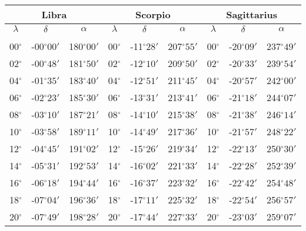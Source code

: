 \begin{table}
\centering
\begin{tabular}{ccc|ccc|ccc}
\multicolumn{3}{c}{Libra}\vline & \multicolumn{3}{c}{Scorpio} \vline& \multicolumn{3}{c}{Sagittarius}\\\hline
$\lambda$& $\delta$& $\alpha$& $\lambda$& $\delta$& $\alpha$& $\lambda$& $\delta$& $\alpha$\\\hline
&&&&&&&&\\[-2ex]
00$^\circ$ & -00$^\circ$$00'$ & 180$^\circ$$00'$ & 00$^\circ$ & -11$^\circ$$28'$ & 207$^\circ$$55'$ & 00$^\circ$ & -20$^\circ$$09'$ & 237$^\circ$$49'$\\
02$^\circ$ & -00$^\circ$$48'$ & 181$^\circ$$50'$ & 02$^\circ$ & -12$^\circ$$10'$ & 209$^\circ$$50'$ & 02$^\circ$ & -20$^\circ$$33'$ & 239$^\circ$$54'$\\
04$^\circ$ & -01$^\circ$$35'$ & 183$^\circ$$40'$ & 04$^\circ$ & -12$^\circ$$51'$ & 211$^\circ$$45'$ & 04$^\circ$ & -20$^\circ$$57'$ & 242$^\circ$$00'$\\
06$^\circ$ & -02$^\circ$$23'$ & 185$^\circ$$30'$ & 06$^\circ$ & -13$^\circ$$31'$ & 213$^\circ$$41'$ & 06$^\circ$ & -21$^\circ$$18'$ & 244$^\circ$$07'$\\
08$^\circ$ & -03$^\circ$$10'$ & 187$^\circ$$21'$ & 08$^\circ$ & -14$^\circ$$10'$ & 215$^\circ$$38'$ & 08$^\circ$ & -21$^\circ$$38'$ & 246$^\circ$$14'$\\
10$^\circ$ & -03$^\circ$$58'$ & 189$^\circ$$11'$ & 10$^\circ$ & -14$^\circ$$49'$ & 217$^\circ$$36'$ & 10$^\circ$ & -21$^\circ$$57'$ & 248$^\circ$$22'$\\
12$^\circ$ & -04$^\circ$$45'$ & 191$^\circ$$02'$ & 12$^\circ$ & -15$^\circ$$26'$ & 219$^\circ$$34'$ & 12$^\circ$ & -22$^\circ$$13'$ & 250$^\circ$$30'$\\
14$^\circ$ & -05$^\circ$$31'$ & 192$^\circ$$53'$ & 14$^\circ$ & -16$^\circ$$02'$ & 221$^\circ$$33'$ & 14$^\circ$ & -22$^\circ$$28'$ & 252$^\circ$$39'$\\
16$^\circ$ & -06$^\circ$$18'$ & 194$^\circ$$44'$ & 16$^\circ$ & -16$^\circ$$37'$ & 223$^\circ$$32'$ & 16$^\circ$ & -22$^\circ$$42'$ & 254$^\circ$$48'$\\
18$^\circ$ & -07$^\circ$$04'$ & 196$^\circ$$36'$ & 18$^\circ$ & -17$^\circ$$11'$ & 225$^\circ$$32'$ & 18$^\circ$ & -22$^\circ$$54'$ & 256$^\circ$$57'$\\
20$^\circ$ & -07$^\circ$$49'$ & 198$^\circ$$28'$ & 20$^\circ$ & -17$^\circ$$44'$ & 227$^\circ$$33'$ & 20$^\circ$ & -23$^\circ$$03'$ & 259$^\circ$$07'$\\

\end{tabular}
\end{table}
